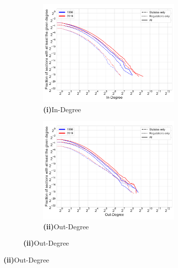 \documentclass[varwidth, border=0pt]{standalone}
\begin{document}
\begin{figure}
\vspace*{6pt}

\begin{subfigure}{\linewidth}
	\begin{multicols}{2}
		\centering
		\begin{subfigure}{\linewidth}
			\includegraphics[width=\linewidth]{../../graphics/in-degree-de-1998-2019.pdf}
			\caption*{\textbf{\textsf{(i)}}\quad In-Degree}
		\end{subfigure}
		\newpage
		\begin{subfigure}{\linewidth}
			\includegraphics[width=\linewidth]{../../graphics/out-degree-de-1998-2019.pdf}
			\caption*{\textbf{\textsf{(ii)}}\quad Out-Degree}
		\end{subfigure}	
	\end{multicols}
	\vspace*{-6pt}
\end{subfigure}
	\end{figure}
	
\end{document}
